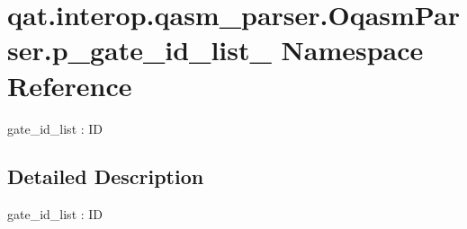 \hypertarget{namespaceqat_1_1interop_1_1qasm__parser_1_1OqasmParser_1_1p__gate__id__list__0}{\section{qat.\-interop.\-qasm\-\_\-parser.\-Oqasm\-Parser.\-p\-\_\-gate\-\_\-id\-\_\-list\-\_ Namespace Reference}
\label{namespaceqat_1_1interop_1_1qasm__parser_1_1OqasmParser_1_1p__gate__id__list__0}
}


gate\-\_\-id\-\_\-list \-: I\-D  




\subsection{Detailed Description}
gate\-\_\-id\-\_\-list \-: I\-D 